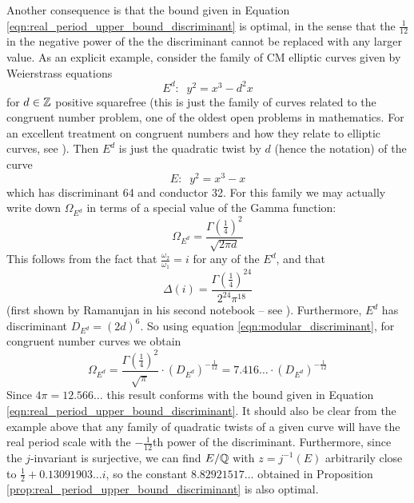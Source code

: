 Another consequence is that the bound given in Equation \ref{eqn:real_period_upper_bound_discriminant} is optimal, in the sense that the $\frac{1}{12}$ in the negative power of the the discriminant cannot be replaced with any larger value. As an explicit example, consider the family of CM elliptic curves given by Weierstrass equations
\begin{equation}
E^d: \;\; y^2 = x^3 - d^2 x
\end{equation}
for $d \in\mathbb{Z}$ positive squarefree (this is just the family of curves related to the congruent number problem, one of the oldest open problems in mathematics. For an excellent treatment on congruent numbers and how they relate to elliptic curves, see \cite{Kob-2012}). Then $E^{d}$ is just the quadratic twist by $d$ (hence the notation) of the curve
\begin{equation}
E: \;\; y^2 = x^3-x
\end{equation}
which has discriminant 64 and conductor 32. For this family we may actually write down $\Omega_{E^d}$ in terms of a special value of the Gamma function:
\begin{equation}
\Omega_{E^d} = \frac{\Gamma(\frac{1}{4})^2}{\sqrt{2\pi d}}
\end{equation}
This follows from the fact that $\frac{\omega_2}{\omega_1} = i$ for any of the $E^d$, and that
\begin{equation}
\Delta(i) = \frac{\Gamma(\frac{1}{4})^{24}}{2^{24}\pi^{18}}
\end{equation}
(first shown by Ramanujan in his second notebook -- see \cite{BeZh-1992}). Furthermore, $E^{d}$ has discriminant $D_{E^{d}} = (2d)^6$. So using equation \ref{eqn:modular_discriminant}, for congruent number curves we obtain
\begin{equation}
\Omega_{E^d} = \frac{\Gamma(\frac{1}{4})^2}{\sqrt{\pi}} \cdot (D_{E^d})^{-\frac{1}{12}} = 7.416\ldots \cdot (D_{E^d})^{-\frac{1}{12}}
\end{equation}
Since $4\pi = 12.566\ldots$ this result conforms with the bound given in Equation \ref{eqn:real_period_upper_bound_discriminant}. It should also be clear from the example above that any family of quadratic twists of a given curve will have the real period scale with the $-\frac{1}{12}$th power of the discriminant. Furthermore, since the $j$-invariant is surjective, we can find $E/\mathbb{Q}$ with $z=j^{-1}(E)$ arbitrarily close to $\frac{1}{2}+0.13091903\ldots i$, so the constant $8.82921517\ldots$ obtained in Proposition \ref{prop:real_period_upper_bound_discriminant} is also optimal. \\

